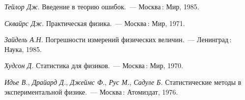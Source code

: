 \documentclass[a5paper,10pt,oneside]{report}
\begin{document}






% 





\begin{thebibliography}{1}

 \textit{Тейлор Дж}. Введение в теорию ошибок.~---
    Москва\,: Мир, 1985.

 \textit{Сквайрс Дж.} Практическая физика.~--- Москва\,: Мир, 1971.

 \textit{Зайдель А.Н.} 
Погрешности измерений физических величин.~--- Ленинград\,: Наука, 1985.


 \textit{Худсон Д.} Статистика для физиков.~---
    Москва\,: Мир, 1970.

 \textit{Идье В.}, \textit{Драйард Д.}, \textit{Джеймс Ф}., \textit{Рус М.}, \textit{Садуле Б.} Статистические методы в экспериментальной физике.~--- Москва\,: Атомиздат, 1976. 


\end{thebibliography}
\end{document}
